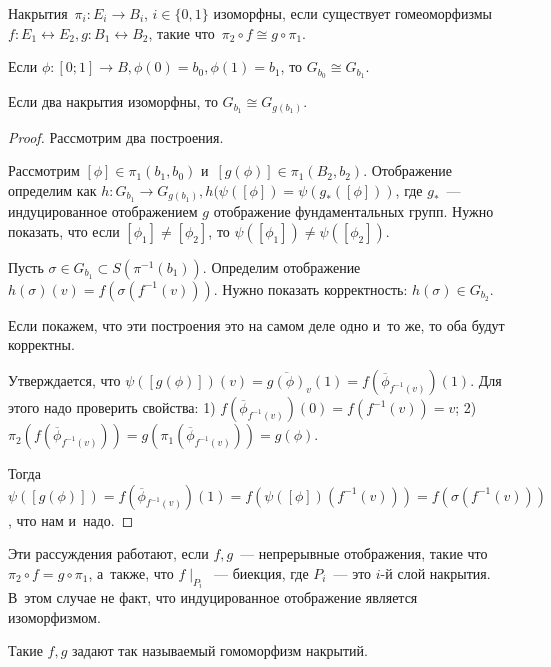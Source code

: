 \documentclass{article}
\begin{document}
\begin{definition}
	Накрытия~$\pi_i: E_i \rightarrow B_i$, $i \in \{0, 1\}$ изоморфны, если
	существует гомеоморфизмы~$f: E_1 \leftrightarrow E_2, g: B_1 \leftrightarrow
	B_2$, такие что~$\pi_2 \circ f \cong g \circ \pi_1$.
\end{definition}

\begin{remark}
	Если $\phi: [0; 1] \rightarrow B, \phi(0) = b_0, \phi(1) = b_1$, то $G_{b_0}
	\cong G_{b_1}$.
\end{remark}
\begin{remark}
	Если два накрытия изоморфны, то $G_{b_1} \cong G_{g(b_1)}$.
\end{remark}
\begin{proof}
	Рассмотрим два построения.

	Рассмотрим $[\phi] \in \pi_1(b_1, b_0)$ и~$[g(\phi)] \in \pi_1(B_2, b_2)$.
	Отображение определим как	$h: G_{b_1} \rightarrow G_{g(b_1)}, h(\psi([\phi]) =
	\psi(g_\ast([\phi]))$, где $g_\ast$~--- индуцированное отображением $g$
	отображение фундаментальных групп. Нужно показать, что если $[\phi_1] \ne
	[\phi_2]$, то $\psi([\phi_1]) \ne \psi([\phi_2])$.

	Пусть $\sigma \in G_{b_1} \subset S(\pi^{-1}(b_1))$. Определим отображение
	$h(\sigma)(v) = f(\sigma(f^{-1}(v)))$. Нужно показать корректность: $h(\sigma)
	\in G_{b_2}$.

	Если покажем, что эти построения это на самом деле одно и~то же, то оба будут
	корректны.

	Утверждается, что $\psi([g(\phi)])(v) = \overline{g(\phi)}_v(1) =
	f(\overline\phi_{f^{-1}(v)})(1)$. Для этого надо проверить свойства:
	1) $f(\overline\phi_{f^{-1}(v)})(0) = f(f^{-1}(v)) = v$; 2)
	$\pi_2(f(\overline\phi_{f^{-1}(v)})) = g(\pi_1(\overline\phi_{f^{-1}(v)})) =
	g(\phi)$.

	Тогда $\psi([g(\phi)]) = f(\overline\phi_{f^{-1}(v)})(1) =
	f(\psi([\phi])(f^{-1}(v))) = f(\sigma(f^{-1}(v)))$, что нам и~надо.
\end{proof}
\begin{remark}
	Эти рассуждения работают, если $f, g$~--- непрерывные отображения, такие что
	$\pi_2 \circ f = g \circ \pi_1$, а~также, что $f\mid_{P_i}$~--- биекция, где
	$P_i$~--- это $i$-й слой накрытия. В~этом случае не факт, что индуцированное
	отображение является изоморфизмом.

	Такие $f, g$ задают так называемый гомоморфизм накрытий.
\end{remark}
\end{document}
